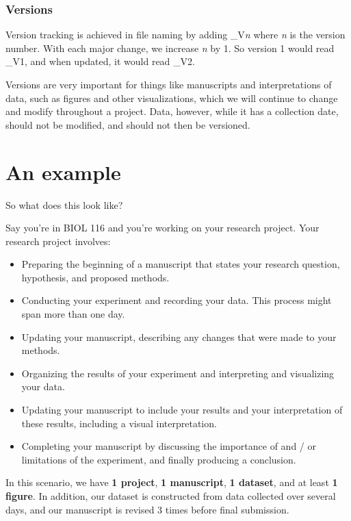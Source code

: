 \documentclass[
]{book}
\providecommand{\tightlist}{%
  \setlength{\itemsep}{0pt}\setlength{\parskip}{0pt}}
\begin{document}
\hypertarget{versions}{%
\subsubsection*{Versions}\label{versions}}

Version tracking is achieved in file naming by adding \_V\emph{n} where \emph{n} is the version number. With each major change, we increase \emph{n} by 1. So version 1 would read \_V1, and when updated, it would read \_V2.

Versions are very important for things like manuscripts and interpretations of data, such as figures and other visualizations, which we will continue to change and modify throughout a project. Data, however, while it has a collection date, should not be modified, and should not then be versioned.

\hypertarget{an-example}{%
\section{An example}\label{an-example}}

So what does this look like?

Say you're in BIOL 116 and you're working on your research project. Your research project involves:

\begin{itemize}
\tightlist
\item
  Preparing the beginning of a manuscript that states your research question, hypothesis, and proposed methods.
\item
  Conducting your experiment and recording your data. This process might span more than one day.
\item
  Updating your manuscript, describing any changes that were made to your methods.
\item
  Organizing the results of your experiment and interpreting and visualizing your data.
\item
  Updating your manuscript to include your results and your interpretation of these results, including a visual interpretation.
\item
  Completing your manuscript by discussing the importance of and / or limitations of the experiment, and finally producing a conclusion.
\end{itemize}

In this scenario, we have \textbf{1 project}, \textbf{1 manuscript}, \textbf{1 dataset}, and at least \textbf{1 figure}. In addition, our dataset is constructed from data collected over several days, and our manuscript is revised 3 times before final submission.
\end{document}
